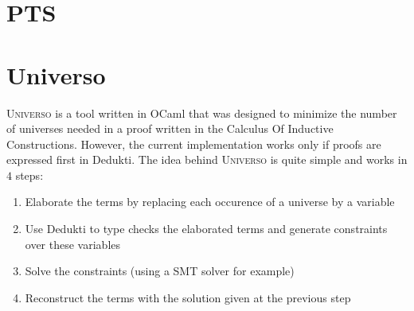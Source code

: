 \documentclass[conference]{IEEEtran}
\newcommand{\universo}{\textsc{Universo}}
\begin{document}


\section{PTS}

\section{Universo}

\universo{} is a tool written in OCaml that was designed to minimize the number of universes needed in a proof written in the Calculus Of Inductive Constructions. However, the current implementation works only if proofs are expressed first in Dedukti. The idea behind \universo{} is quite simple and works in \(4\) steps:
\begin{enumerate}
\item Elaborate the terms by replacing each occurence of a universe by a variable
\item Use Dedukti to type checks the elaborated terms and generate constraints over these variables
\item Solve the constraints (using a SMT solver for example)
\item Reconstruct the terms with the solution given at the previous step
\end{enumerate}
\end{document}
